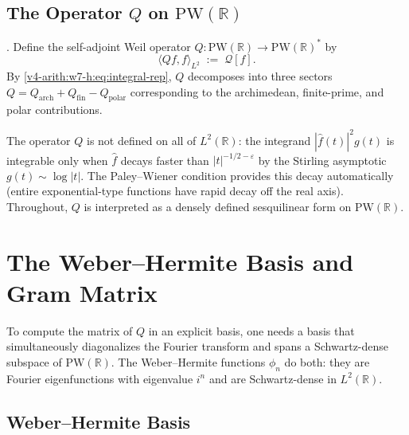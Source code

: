 \subsection{The Operator \(Q\) on \(\mathrm{PW}(\mathbb{R})\)}
\label{v4-arith:w7-h:quadratic-form:operator}

\begin{definition}
\label{v4-arith:w7-h:def:Q-operator}
\ClaimStatusDefinitional. Define the self-adjoint Weil operator
\(Q\colon\mathrm{PW}(\mathbb{R})\to\mathrm{PW}(\mathbb{R})^{*}\) by
\begin{equation}
\label{v4-arith:w7-h:eq:Q-operator}
\langle Qf,f\rangle_{L^{2}}\;:=\;\mathcal{Q}[f].
\end{equation}
By \eqref{v4-arith:w7-h:eq:integral-rep}, \(Q\) decomposes into three
sectors \(Q=Q_{\mathrm{arch}}+Q_{\mathrm{fin}}-Q_{\mathrm{polar}}\)
corresponding to the archimedean, finite-prime, and polar
contributions.
\end{definition}

\begin{remark}
\label{v4-arith:w7-h:rem:domain}
The operator \(Q\) is not defined on all of \(L^{2}(\mathbb{R})\): the
integrand \(|\widehat{f}(t)|^{2}g(t)\) is integrable only when
\(\widehat{f}\) decays faster than \(|t|^{-1/2-\varepsilon}\) by the
Stirling asymptotic \(g(t)\sim\log|t|\). The Paley--Wiener condition
provides this decay automatically (entire exponential-type functions
have rapid decay off the real axis). Throughout, \(Q\) is interpreted
as a densely defined sesquilinear form on \(\mathrm{PW}(\mathbb{R})\).
\end{remark}

\section{The Weber--Hermite Basis and Gram Matrix}
\label{v4-arith:w7-h:hermite-basis}

To compute the matrix of \(Q\) in an explicit basis, one needs a basis
that simultaneously diagonalizes the Fourier transform and spans a
Schwartz-dense subspace of \(\mathrm{PW}(\mathbb{R})\). The Weber--Hermite
functions \(\phi_n\) do both: they are Fourier eigenfunctions with
eigenvalue \(i^n\) and are Schwartz-dense in \(L^2(\mathbb{R})\).

\subsection{Weber--Hermite Basis}
\label{v4-arith:w7-h:hermite-basis:def}

